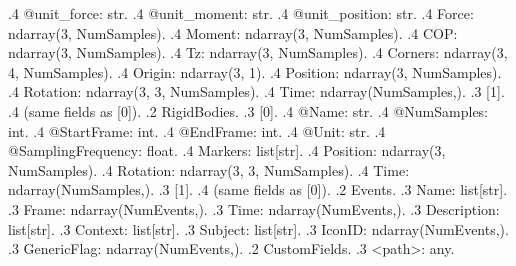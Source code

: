 \documentclass{article}
\newcommand{\added}[1]{\textcolor{added}{#1}}
\newcommand{\changed}[1]{\textcolor{changed}{#1}}
\begin{document}
{.4 \added{@unit\_force: str}.
.4 \added{@unit\_moment: str}.
.4 \added{@unit\_position: str}.
.4 Force: ndarray(3, NumSamples).
.4 Moment: ndarray(3, NumSamples).
.4 COP: ndarray(3, NumSamples).
.4 \added{Tz: ndarray(3, NumSamples)}.
.4 \changed{Corners: ndarray(3, 4, NumSamples)}.
.4 \changed{Origin: ndarray(3, 1)}.
.4 \changed{Position: ndarray(3, NumSamples)}.
.4 \changed{Rotation: ndarray(3, 3, NumSamples)}.
.4 \added{Time: ndarray(NumSamples,)}.
.3 [1].
.4 (same fields as [0]).
.2 \changed{RigidBodies}.
.3 [0].
.4 @Name: str.
.4 \changed{@NumSamples: int}.
.4 \added{@StartFrame: int}.
.4 \added{@EndFrame: int}.
.4 \added{@Unit: str}.
.4 \added{@SamplingFrequency: float}.
.4 \changed{Markers: list[str]}.
.4 \changed{Position: ndarray(3, NumSamples)}.
.4 Rotation: ndarray(3, 3, NumSamples).
.4 \added{Time: ndarray(NumSamples,)}.
.3 [1].
.4 (same fields as [0]).
.2 \changed{Events}.
.3 \changed{Name: list[str]}.
.3 \changed{Frame: ndarray(NumEvents,)}.
.3 \changed{Time: ndarray(NumEvents,)}.
.3 \added{Description: list[str]}.
.3 \added{Context: list[str]}.
.3 \added{Subject: list[str]}.
.3 \added{IconID: ndarray(NumEvents,)}.
.3 \added{GenericFlag: ndarray(NumEvents,)}.
.2 CustomFields.
.3 <path>: any.
}
\end{document}
